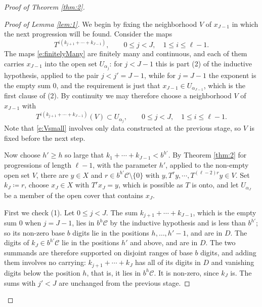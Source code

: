 \begin{proof}[Proof of Theorem \ref{thm:2}]
\begin{proof}[Proof of Lemma \ref{lem:1}]
We begin by fixing the neighborhood $V$ of $x_{J-1}$ in which the next progression will be found.  
Consider the maps 
\begin{equation} \label{e:finitelyMany}
T^{i(k_{j+1}+\cdots +k_{J-1})} , \qquad 0 \leq j <J, \quad 1 \leq i \leq \ell -1 . 
\end{equation}
The maps \eqref{e:finitelyMany} are finitely many and continuous, and each of them carries $x_{J-1}$ into the open set $U_{\alpha _j}$: 
for $j<J-1$ this is part (2) of the inductive hypothesis, applied to the pair $j<j'=J-1$, while for $j=J-1$ the exponent is the empty sum $0$, 
and the requirement is just that $x_{J-1}\in U_{\alpha _{J-1}}$, which is the first clause of (2).  
By continuity we may therefore choose a neighborhood $V$ of $x_{J-1}$ with 
\begin{equation} \label{e:Vsmall}
T^{i(k_{j+1}+\cdots +k_{J-1})}(V) \subset U_{\alpha _j}, \qquad 0 \leq j <J, \quad 1 \leq i \leq \ell -1 . 
\end{equation}
Note that \eqref{e:Vsmall} involves only data constructed at the previous stage, so $V$ is fixed before the next step.  

Now choose $h'\geq h$ so large that $k_1+\cdots +k_{J-1}<b^{h'}$. By Theorem \ref{thm:2} for progressions of length $\ell-1$, with the parameter $h'$, applied to the non-empty open set $V$, there are $y\in X$ and $r\in b^{h'}\mathcal C\setminus\{0\}$ with $y,T^{r}y,\cdots ,T^{(\ell-2)r}y \in V$.  
Set $k_J \coloneqq r$, choose $x_J \in X$ with $T ^{r}x_J = y$, which is possible as $T$ is onto, 
and let $U_{\alpha_J}$ be a member of the open cover that contains $x_J$.  

First we check (1).  Let $0 \leq j <J$.  The sum $k_{j+1}+\cdots +k_{J-1}$, which is the empty sum $0$ when $j=J-1$, 
lies in $b ^{h}\mathcal C$ by the inductive hypothesis and is less than $b^{h'}$; so its non-zero base $b$ digits lie in the positions $h, \ldots, h'-1$, and are in $D$.  
The digits of $k_J \in b^{h'}\mathcal C$ lie in the positions $h'$ and above, and are in $D$.  
The two summands are therefore supported on disjoint ranges of base $b$ digits, and adding them involves no carrying: 
$k_{j+1}+\cdots+k_J$ has all of its digits in $D$ and vanishing digits below the position $h$, that is, it lies in $b^{h}\mathcal C$.  It is non-zero, since $k_J$ is.  
The sums with $j' <J$ are unchanged from the previous stage.  


\end{proof}
\end{proof}
